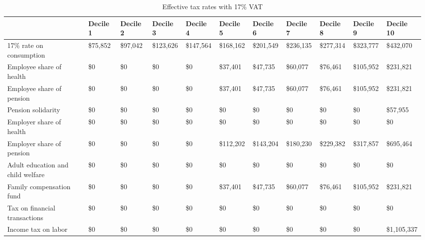 \documentclass[12pt]{article}
\begin{document}
\begin{landscape}
\begin{table}[]
\caption{Effective tax rates with 17\% VAT}
\label{table:t17}
\footnotesize
\begin{tabular}{lllllllllll} \hline
\label{table:t17}

& Decile 1                          & Decile 2  & Decile 3  & Decile 4  & Decile 5    & Decile 6    & Decile 7    & Decile 8    & Decile 9    & Decile 10                 \\ \hline
17\% rate on consumption          & \$75,852  & \$97,042  & \$123,626 & \$147,564   & \$168,162   & \$201,549   & \$236,135   & \$277,314   & \$323,777   & \$432,070    \\
Employee share of health          & \$0       & \$0       & \$0       & \$0         & \$37,401    & \$47,735    & \$60,077    & \$76,461    & \$105,952   & \$231,821    \\
Employee share of pension         & \$0       & \$0       & \$0       & \$0         & \$37,401    & \$47,735    & \$60,077    & \$76,461    & \$105,952   & \$231,821    \\
Pension solidarity                & \$0       & \$0       & \$0       & \$0         & \$0         & \$0         & \$0         & \$0         & \$0         & \$57,955     \\
Employer share of health          & \$0       & \$0       & \$0       & \$0         & \$0         & \$0         & \$0         & \$0         & \$0         & \$0          \\
Employer share of pension         & \$0       & \$0       & \$0       & \$0         & \$112,202   & \$143,204   & \$180,230   & \$229,382   & \$317,857   & \$695,464    \\
Adult education and child welfare & \$0       & \$0       & \$0       & \$0         & \$0         & \$0         & \$0         & \$0         & \$0         & \$0          \\
Family compensation fund          & \$0       & \$0       & \$0       & \$0         & \$37,401    & \$47,735    & \$60,077    & \$76,461    & \$105,952   & \$231,821    \\
Tax on financial transactions     & \$0       & \$0       & \$0       & \$0         & \$0         & \$0         & \$0         & \$0         & \$0         & \$0          \\
Income tax on labor               & \$0       & \$0       & \$0       & \$0         & \$0         & \$0         & \$0         & \$0         & \$0         & \$1,105,337  \\

\end{tabular}
\end{table}
\end{landscape}
\end{document}
